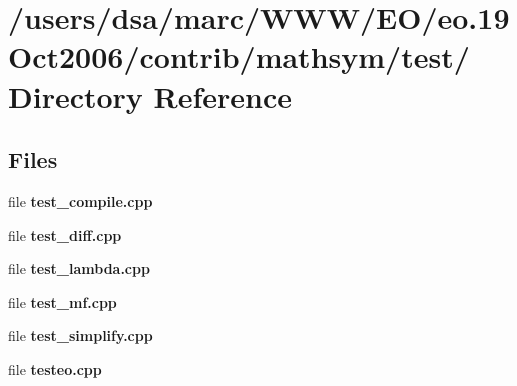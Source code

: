 \section{/users/dsa/marc/WWW/EO/eo.19Oct2006/contrib/mathsym/test/ Directory Reference}
\label{dir_000029}
\subsection*{Files}
\begin{CompactItemize}
\item 
file {\bf test_compile.cpp}
\item 
file {\bf test_diff.cpp}
\item 
file {\bf test_lambda.cpp}
\item 
file {\bf test_mf.cpp}
\item 
file {\bf test_simplify.cpp}
\item 
file {\bf testeo.cpp}
\end{CompactItemize}

